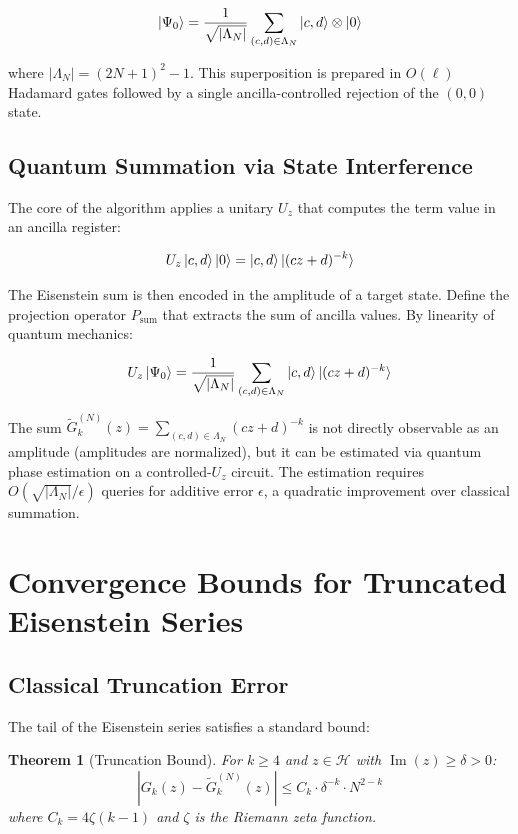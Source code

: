 \documentclass[11pt,a4paper]{article}
\newtheorem{theorem}{Theorem}[section]
\begin{document}
\begin{equation}\label{eq:superposition}
\ket{\Psi_0} = \frac{1}{\sqrt{|\Lambda_N|}}
\sum_{(c,d) \in \Lambda_N} \ket{c,d} \otimes \ket{0}
\end{equation}

where $|\Lambda_N| = (2N+1)^2 - 1$. This superposition is prepared
in $O(\ell)$ Hadamard gates followed by a single ancilla-controlled
rejection of the $(0,0)$ state.

\subsection{Quantum Summation via State Interference}

The core of the algorithm applies a unitary $U_z$ that computes the
term value in an ancilla register:

\[
U_z \ket{c,d}\ket{0} = \ket{c,d}\ket{(cz+d)^{-k}}
\]

The Eisenstein sum is then encoded in the amplitude of a target state.
Define the projection operator $P_{\mathrm{sum}}$ that extracts the
sum of ancilla values. By linearity of quantum mechanics:

\begin{equation}\label{eq:interference}
U_z \ket{\Psi_0} = \frac{1}{\sqrt{|\Lambda_N|}}
\sum_{(c,d) \in \Lambda_N} \ket{c,d}\ket{(cz+d)^{-k}}
\end{equation}

The sum $\tilde{G}_k^{(N)}(z) = \sum_{(c,d) \in \Lambda_N} (cz+d)^{-k}$
is not directly observable as an amplitude (amplitudes are normalized),
but it can be estimated via quantum phase estimation on a
controlled-$U_z$ circuit. The estimation requires
$O(\sqrt{|\Lambda_N|} / \epsilon)$ queries for additive error
$\epsilon$, a quadratic improvement over classical summation.

\section{Convergence Bounds for Truncated Eisenstein Series}

\subsection{Classical Truncation Error}

The tail of the Eisenstein series satisfies a standard bound:

\begin{theorem}[Truncation Bound]\label{thm:truncation}
For $k \geq 4$ and $z \in \mathcal{H}$ with
$\operatorname{Im}(z) \geq \delta > 0$:
\[
\left| G_k(z) - \tilde{G}_k^{(N)}(z) \right|
\leq C_k \cdot \delta^{-k} \cdot N^{2-k}
\]
where $C_k = 4\zeta(k-1)$ and $\zeta$ is the Riemann zeta function.
\end{theorem}
\end{document}
